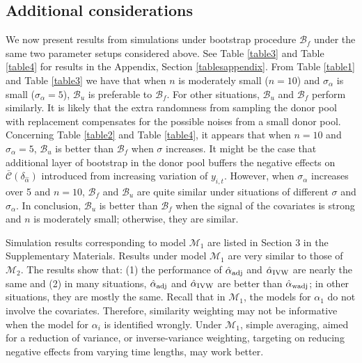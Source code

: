\documentclass[11pt,3p,review,authoryear]{elsarticle}
\def\mc#1{\mathcal{#1}} %
\theoremstyle{definition}
\begin{document}
\subsection{Additional considerations}
\label{parametricbootstrapsimulation2}

We now present results from simulations under bootstrap procedure $\mc{B}_f$ under the same two parameter setups considered above. See Table \ref{table3} and Table \ref{table4} for results in the Appendix, Section \ref{tablesappendix}. From Table \ref{table1} and Table \ref{table3} we have that when $n$ is moderately small ($n = 10$) and $\sigma_{\alpha}$ is small ($\sigma_{\alpha}=5$), $\mc{B}_u$ is preferable to $\mc{B}_f$. For other situations, $\mc{B}_u$  and $\mc{B}_f$ perform similarly. It is likely that the extra randomness from sampling the donor pool with replacement compensates for the possible noises from a small donor pool. Concerning  Table \ref{table2} and Table \ref{table4}, it appears that when $n = 10$ and $\sigma_{\alpha}=5$, $\mc{B}_u$ is better than  $\mc{B}_f$  when $\sigma$ increases. It might be the case that additional layer of bootstrap in the donor pool buffers the negative effects on $\bar{\mc{C}}(\delta_{\hat{\alpha}})$  introduced from increasing variation of $y_{i,t}$. However, when $\sigma_{\alpha}$ increases over 5 and $n = 10$,  $\mc{B}_f$ and $\mc{B}_u$ are quite similar under  situations of different $\sigma$ and $\sigma_{\alpha}$. In conclusion, $\mc{B}_u$ is better than $\mc{B}_f$ when the signal of the covariates is strong and $n$ is moderately small; otherwise, they are similar. 
 
 Simulation results corresponding to model $\mc{M}_1$ are listed in Section 3 in the Supplementary Materials. Results under model $\mc{M}_1$ are very similar to those of $\mc{M}_2$. The results show that: (1) the performance of $\hat{\alpha}_{\rm adj}$ and  $\hat{\alpha}_{\rm IVW}$ are nearly the same and (2) in many situations, $\hat{\alpha}_{\rm adj}$ and  $\hat{\alpha}_{\rm IVW}$ are  better than $\hat{\alpha}_{\rm wadj}$; in other situations, they are mostly the same. Recall that in $\mc{M}_1$, the models for $\alpha_1$ do not involve the covariates. Therefore, similarity weighting may not be informative when the model for $\alpha_i$ is identified wrongly. Under $\mc{M}_1$, simple averaging, aimed for a reduction of variance, or inverse-variance weighting, targeting on reducing negative effects from varying time lengths, may work better.
\end{document}
